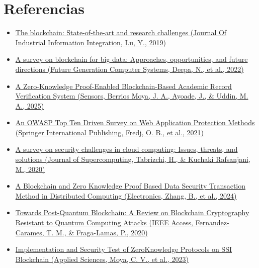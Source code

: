 \documentclass[conference]{IEEEtran}
\begin{document}
\section*{Referencias}
\begin{itemize}

    \item 
    \href{https://doi.org/10.1016/j.jii.2019.04.002}{The blockchain: State-of-the-art and research challenges (Journal Of Industrial Information Integration, Lu, Y., 2019)}

    \item 
    \href{https://doi.org/10.1016/j.future.2022.01.017}{A survey on blockchain for big data: Approaches, opportunities, and future directions (Future Generation Computer Systems, Deepa, N., et al., 2022)}

    \item \begin{otherlanguage}{english}
    \href{https://doi.org/10.3390/s25113450}{A Zero-Knowledge Proof-Enabled Blockchain-Based Academic Record Verification System (Sensors, Berrios Moya, J. A., Ayoade, J., \& Uddin, M. A., 2025)}
    \end{otherlanguage}
    \item 
    \href{https://doi.org/10.1007/978-3-030-68887-5_14}{An OWASP Top Ten Driven Survey on Web Application Protection Methods (Springer International Publishing, Fredj, O. B., et al., 2021)}

    \item 
    \href{https://doi.org/10.1007/s11227-020-03213-1}{A survey on security challenges in cloud computing: Issues, threats, and solutions (Journal of Supercomputing, Tabrizchi, H., \& Kuchaki Rafsanjani, M., 2020)}

    \item 
    \href{https://doi.org/10.3390/electronics13214260}{A Blockchain and Zero Knowledge Proof Based Data Security Transaction Method in Distributed Computing (Electronics, Zhang, B., et al., 2024)}
    \item 
    \href{https://doi.org/10.1109/access.2020.2968985}{Towards Post-Quantum Blockchain: A Review on Blockchain Cryptography Resistant to Quantum Computing Attacks (IEEE Access, Fernandez-Carames, T. M., \& Fraga-Lamas, P., 2020)}
    \item 
    \href{https://doi.org/10.3390/app13095552}{Implemen\-tation and Security Test of Zero\-Knowledge Proto\-cols on SSI Block\-chain (Applied Sciences, Moya, C. V., et al., 2023)}

\end{itemize}
\end{document}
